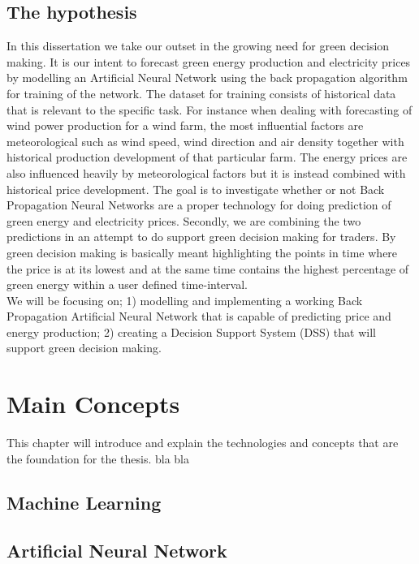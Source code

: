 \documentclass[twoside,11pt,openright]{report}
\begin{document}
\section{The hypothesis}
In this dissertation we take our outset in the growing need for green decision making. It is our intent to forecast green energy production and electricity prices by modelling an Artificial Neural Network using the back propagation algorithm for training of the network. The dataset for training consists of historical data that is relevant to the specific task. For instance when dealing with forecasting of wind power production for a wind farm, the most influential factors are meteorological such as wind speed, wind direction and air density together with historical production development of that particular farm. The energy prices are also influenced heavily by meteorological factors but it is instead combined with historical price development.
The goal is to investigate whether or not Back Propagation Neural Networks are a proper technology for doing prediction of green energy and electricity prices. Secondly, we are combining the two predictions in an attempt to do support green decision making for traders. By green decision making is basically meant highlighting the points in time where the price is at its lowest and at the same time contains the highest percentage of green energy within a user defined time-interval.
\\[0.5cm]
We will be focusing on; 1) modelling and implementing a working Back Propagation Artificial Neural Network that is capable of predicting price and energy production; 2) creating a Decision Support System (DSS) that will support green decision making.



\chapter{Main Concepts}
This chapter will introduce and explain the technologies and concepts that are the foundation for the thesis. bla bla
\label{ch:foundations}
\section{Machine Learning}


\newpage
\section{Artificial Neural Network}
\end{document}
